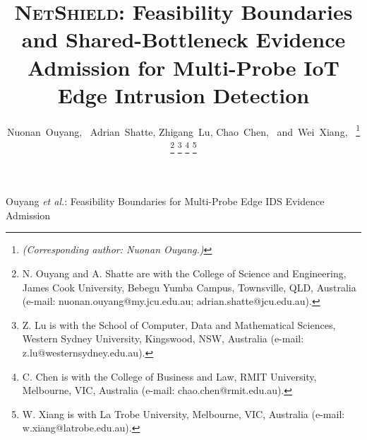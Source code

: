 \documentclass[10pt,journal]{IEEEtran}
\newcommand{\NetShield}{\textsc{NetShield}}
\begin{document}
\title{\NetShield: Feasibility Boundaries and Shared-Bottleneck
Evidence Admission for Multi-Probe IoT Edge Intrusion Detection}

\author{
Nuonan~Ouyang,~
Adrian~Shatte,
Zhigang~Lu,
Chao~Chen,~
and~Wei~Xiang,~%
\thanks{\textit{(Corresponding author: Nuonan Ouyang.)}}%
\thanks{N. Ouyang and A. Shatte are with the College of Science and
Engineering, James Cook University, Bebegu Yumba Campus, Townsville,
QLD, Australia
(e-mail: nuonan.ouyang@my.jcu.edu.au;
adrian.shatte@jcu.edu.au).}%
\thanks{Z. Lu is with the School of Computer, Data and Mathematical
Sciences, Western Sydney University, Kingswood, NSW, Australia
(e-mail: z.lu@westernsydney.edu.au).}%
\thanks{C. Chen is with the College of Business and Law,
RMIT University, Melbourne, VIC, Australia
(e-mail: chao.chen@rmit.edu.au).}%
\thanks{W. Xiang is with La Trobe University,
Melbourne, VIC, Australia
(e-mail: w.xiang@latrobe.edu.au).}%
}

%
{Ouyang \MakeLowercase{\textit{et al.}}:
Feasibility Boundaries for Multi-Probe Edge IDS Evidence Admission}

\maketitle
\end{document}
